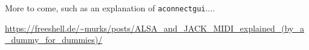    More to come, such as an explanation of \texttt{aconnectgui}....

   \url{https://freeshell.de/~murks/posts/ALSA_and_JACK_MIDI_explained_(by_a_dummy_for_dummies)/}

